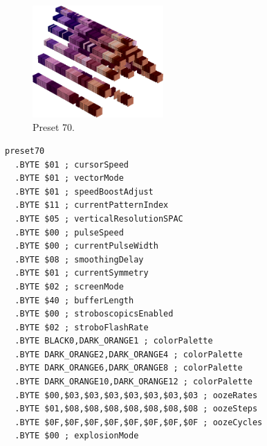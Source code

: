 \begin{minipage}[b]{0.48\linewidth}
\begin{figure}[H]                                                          
  \centering                                                             
  \begin{adjustbox}{width=5cm,center}                                   
  \includegraphics[width=5cm]{src/colorspace_presets/preset70-45.png}%
  \end{adjustbox}                                                        
\caption*{Preset 70.}                                           
\end{figure}                                                               
\end{minipage}
\hspace{0.1cm}
\begin{minipage}[b]{0.48\linewidth}                                       
\begin{lstlisting}[basicstyle=\ttfamily\tiny]
preset70
  .BYTE $01 ; cursorSpeed
  .BYTE $01 ; vectorMode
  .BYTE $01 ; speedBoostAdjust
  .BYTE $11 ; currentPatternIndex
  .BYTE $05 ; verticalResolutionSPAC
  .BYTE $00 ; pulseSpeed
  .BYTE $00 ; currentPulseWidth
  .BYTE $08 ; smoothingDelay
  .BYTE $01 ; currentSymmetry
  .BYTE $02 ; screenMode
  .BYTE $40 ; bufferLength
  .BYTE $00 ; stroboscopicsEnabled
  .BYTE $02 ; stroboFlashRate
  .BYTE BLACK0,DARK_ORANGE1 ; colorPalette
  .BYTE DARK_ORANGE2,DARK_ORANGE4 ; colorPalette
  .BYTE DARK_ORANGE6,DARK_ORANGE8 ; colorPalette
  .BYTE DARK_ORANGE10,DARK_ORANGE12 ; colorPalette
  .BYTE $00,$03,$03,$03,$03,$03,$03,$03 ; oozeRates
  .BYTE $01,$08,$08,$08,$08,$08,$08,$08 ; oozeSteps
  .BYTE $0F,$0F,$0F,$0F,$0F,$0F,$0F,$0F ; oozeCycles
  .BYTE $00 ; explosionMode
\end{lstlisting}
\end{minipage}

